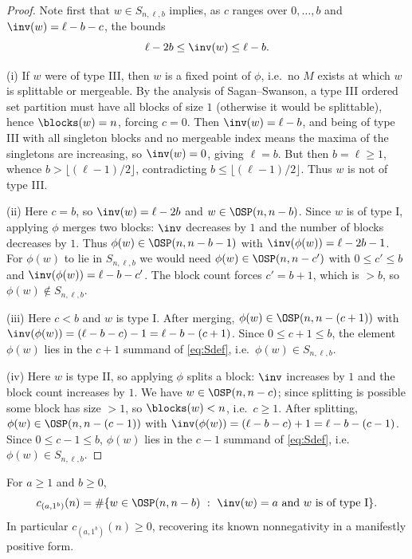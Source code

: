 \begin{proof}
Note first that $w\in S_{n,\ell,b}$ implies, as $c$ ranges over $0,\dots,b$ and
$\inv(w)=\ell-b-c$, the bounds
\begin{equation}\label{eq:invbounds}
\ell-2b\le \inv(w)\le \ell-b .
\end{equation}

(i) If $w$ were of type III, then $w$ is a fixed point of $\phi$, i.e.\ no $M$ exists at
which $w$ is splittable or mergeable. By the analysis of Sagan--Swanson, a type III
ordered set partition must have all blocks of size $1$ (otherwise it would be splittable),
hence $\blocks(w)=n$, forcing $c=0$. Then $\inv(w)=\ell-b$, and being of type III with all
singleton blocks and no mergeable index means the maxima of the singletons are increasing,
so $\inv(w)=0$, giving $\ell=b$. But then $b=\ell\ge1$, whence
$b>\lfloor(\ell-1)/2\rfloor$, contradicting $b\le\lfloor(\ell-1)/2\rfloor$. Thus $w$ is not
of type III.

(ii) Here $c=b$, so $\inv(w)=\ell-2b$ and $w\in\OSP(n,n-b)$. Since $w$ is of type I,
applying $\phi$ merges two blocks: $\inv$ decreases by $1$ and the number of blocks
decreases by $1$. Thus $\phi(w)\in\OSP(n,n-b-1)$ with $\inv(\phi(w))=\ell-2b-1$. For
$\phi(w)$ to lie in $S_{n,\ell,b}$ we would need $\phi(w)\in\OSP(n,n-c')$ with
$0\le c'\le b$ and $\inv(\phi(w))=\ell-b-c'$. The block count forces $c'=b+1$, which is
$>b$, so $\phi(w)\notin S_{n,\ell,b}$.

(iii) Here $c<b$ and $w$ is type I. After merging, $\phi(w)\in\OSP(n,n-(c+1))$ with
$\inv(\phi(w))=(\ell-b-c)-1=\ell-b-(c+1)$. Since $0\le c+1\le b$, the element $\phi(w)$ lies
in the $c+1$ summand of \eqref{eq:Sdef}, i.e.\ $\phi(w)\in S_{n,\ell,b}$.

(iv) Here $w$ is type II, so applying $\phi$ splits a block: $\inv$ increases by $1$ and the
block count increases by $1$. We have $w\in\OSP(n,n-c)$; since splitting is possible some
block has size $>1$, so $\blocks(w)<n$, i.e.\ $c\ge1$. After splitting,
$\phi(w)\in\OSP(n,n-(c-1))$ with $\inv(\phi(w))=(\ell-b-c)+1=\ell-b-(c-1)$. Since
$0\le c-1\le b$, $\phi(w)$ lies in the $c-1$ summand of \eqref{eq:Sdef}, i.e.\
$\phi(w)\in S_{n,\ell,b}$.
\end{proof}

\begin{theorem}\label{thm:main}
For $a\ge1$ and $b\ge0$,
\begin{equation}\label{eq:posformula}
c_{(a,1^b)}(n)=\#\{w\in\OSP(n,n-b)\ :\ \inv(w)=a\ \text{and}\ w\ \text{is of type I}\}.
\end{equation}
In particular $c_{(a,1^b)}(n)\ge0$, recovering its known nonnegativity in a manifestly
positive form.
\end{theorem}

